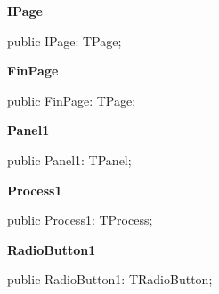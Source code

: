 \documentclass{report}
\newif\ifpdf
\begin{document}
\begin{list}{}
\par  \label{mainunit.TIWizFrm-IPage}
\item[\textbf{IPage}\hfill]
\ifpdf
\begin{flushleft}
\fi
\begin{ttfamily}
public IPage: TPage;\end{ttfamily}

\ifpdf
\end{flushleft}
\fi


\par  \label{mainunit.TIWizFrm-FinPage}
\item[\textbf{FinPage}\hfill]
\ifpdf
\begin{flushleft}
\fi
\begin{ttfamily}
public FinPage: TPage;\end{ttfamily}

\ifpdf
\end{flushleft}
\fi


\par  \label{mainunit.TIWizFrm-Panel1}
\item[\textbf{Panel1}\hfill]
\ifpdf
\begin{flushleft}
\fi
\begin{ttfamily}
public Panel1: TPanel;\end{ttfamily}

\ifpdf
\end{flushleft}
\fi


\par  \label{mainunit.TIWizFrm-Process1}
\item[\textbf{Process1}\hfill]
\ifpdf
\begin{flushleft}
\fi
\begin{ttfamily}
public Process1: TProcess;\end{ttfamily}

\ifpdf
\end{flushleft}
\fi


\par  \label{mainunit.TIWizFrm-RadioButton1}
\item[\textbf{RadioButton1}\hfill]
\ifpdf
\begin{flushleft}
\fi
\begin{ttfamily}
public RadioButton1: TRadioButton;\end{ttfamily}

\ifpdf
\end{flushleft}
\fi



\end{list}
\end{document}
